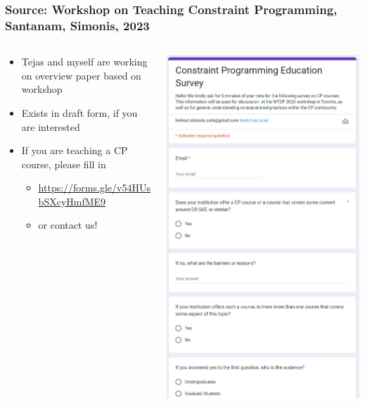 \documentclass[dvipsnames,aspectratio=169]{beamer}
\begin{document}
\begin{frame}
\frametitle{Source: Workshop on Teaching Constraint Programming, Santanam, Simonis, 2023}
\begin{columns}
\begin{column}{0.6\textwidth}
\begin{itemize}
\item Tejas and myself are working on overview paper based on workshop
\item Exists in draft form, if you are interested
\item If you are teaching a CP course, please fill in
\begin{itemize}
\item \url{https://forms.gle/v54HUsbSXcyHmfME9}
\item or contact us!
\end{itemize}
\end{itemize}
\end{column}
\begin{column}{0.4\textwidth}
\includegraphics[width=.6\textwidth]{images/wtcpsurvey}
\end{column}
\end{columns}
\end{frame}
\end{document}
